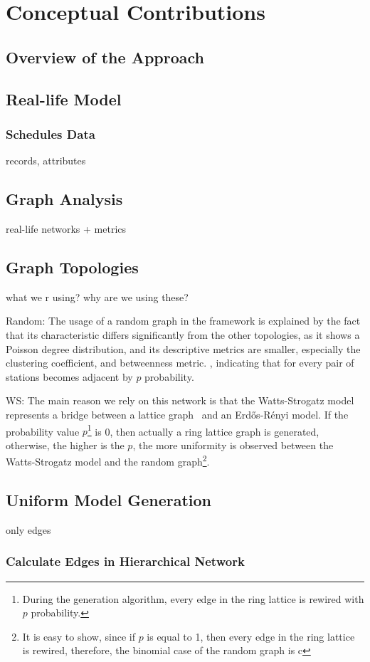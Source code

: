 \chapter{Conceptual Contributions}

\section{Overview of the Approach}

\section{Real-life Model}
\subsection{Schedules Data}
records, attributes

\section{Graph Analysis}
real-life networks + metrics
\section{Graph Topologies}
what we r using?
why are we using these?

Random:
	The usage of a random graph in the framework is explained by the fact that its characteristic differs significantly from the other topologies, as it shows a Poisson degree distribution, and its descriptive metrics are smaller, especially the clustering coefficient, and betweenness metric. , indicating that for every pair of stations becomes adjacent by $p$ probability. 
	
WS:
	The main reason we rely on this network is that the Watts-Strogatz model represents a bridge between a lattice graph~\cite{lattice} and an Erdős-Rényi model. If the probability value $p$\footnote{During the generation algorithm, every edge in the ring lattice is rewired with $p$ probability.} is 0, then actually a ring lattice graph is generated, otherwise, the higher is the $p$, the more uniformity is observed between the Watts-Strogatz model and the random graph\footnote{It is easy to show, since if $p$ is equal to 1, then every edge in the ring lattice is rewired, therefore, the binomial case of the random graph is c}.
	

\section{Uniform Model Generation}
only edges
\subsection{Calculate Edges in Hierarchical Network}

